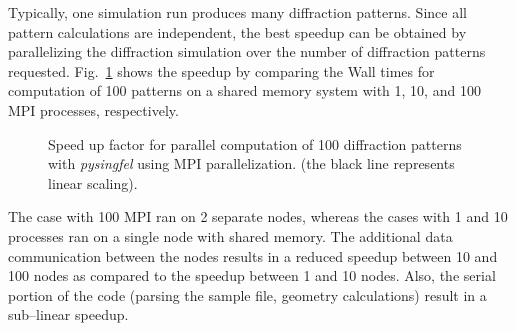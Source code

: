\documentclass[10pt]{scrartcl}
\begin{document}
Typically, one simulation run produces many
diffraction patterns. Since all pattern calculations are independent, the
best speedup can be obtained by parallelizing the diffraction simulation over the
number of diffraction patterns requested. Fig.~\ref{fig:pysingfel_performance}
shows the speedup by comparing the Wall times for computation of
100 patterns on a shared memory system with 1, 10, and 100 MPI processes,
respectively.
\begin{figure}[ht]
  \begin{center}
  \end{center}
  \caption{Speed up factor for parallel computation of 100 diffraction patterns with
    \textit{pysingfel} using MPI parallelization. (the black line represents linear scaling).}
  \label{fig:pysingfel_performance}
\end{figure}
The case with 100 MPI ran on 2 separate nodes, whereas the cases with 1 and 10 processes
ran on a single node with shared memory. The additional data communication
between the nodes results in a reduced speedup between 10 and 100 nodes
as compared to the speedup between 1 and 10 nodes. Also, the serial portion of
the code (parsing the sample file, geometry calculations) result in a
sub--linear  speedup.
\end{document}
